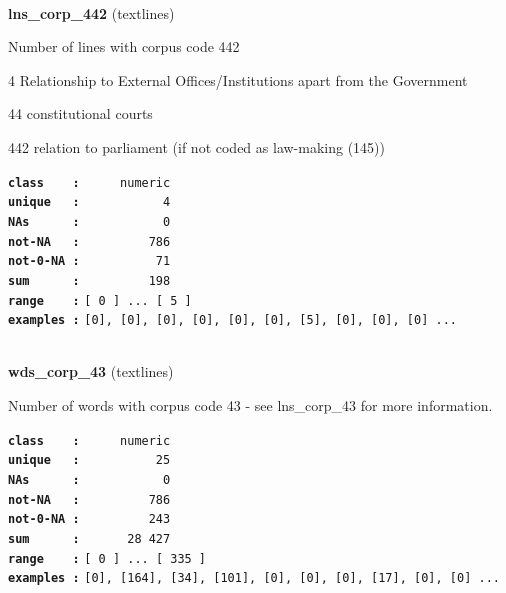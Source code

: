 \documentclass[]{article}
\begin{document}
~

\textbf{lns\_corp\_442} (textlines)

Number of lines with corpus code 442

4 Relationship to External Offices/Institutions apart from the
Government

44 constitutional courts

442 relation to parliament (if not coded as law-making (145))

\textbf{\texttt{class\ \ \ \ :}} \texttt{~~~~~numeric}\\
\textbf{\texttt{unique\ \ \ :}} \texttt{~~~~~~~~~~~4}\\
\textbf{\texttt{NAs\ \ \ \ \ \ :}} \texttt{~~~~~~~~~~~0}\\
\textbf{\texttt{not-NA\ \ \ :}} \texttt{~~~~~~~~~786}\\
\textbf{\texttt{not-0-NA\ :}} \texttt{~~~~~~~~~~71}\\
\textbf{\texttt{sum\ \ \ \ \ \ :}} \texttt{~~~~~~~~~198}\\
\textbf{\texttt{range\ \ \ \ :}}
\texttt{{[}\ 0\ {]}\ ...\ {[}\ 5\ {]}}\\
\textbf{\texttt{examples\ :}}
\texttt{{[}0{]},\ {[}0{]},\ {[}0{]},\ {[}0{]},\ {[}0{]},\ {[}0{]},\ {[}5{]},\ {[}0{]},\ {[}0{]},\ {[}0{]}\ ...}\\

~

\textbf{wds\_corp\_43} (textlines)

Number of words with corpus code 43 - see lns\_corp\_43 for more
information.

\textbf{\texttt{class\ \ \ \ :}} \texttt{~~~~~numeric}\\
\textbf{\texttt{unique\ \ \ :}} \texttt{~~~~~~~~~~25}\\
\textbf{\texttt{NAs\ \ \ \ \ \ :}} \texttt{~~~~~~~~~~~0}\\
\textbf{\texttt{not-NA\ \ \ :}} \texttt{~~~~~~~~~786}\\
\textbf{\texttt{not-0-NA\ :}} \texttt{~~~~~~~~~243}\\
\textbf{\texttt{sum\ \ \ \ \ \ :}} \texttt{~~~~~~28~427}\\
\textbf{\texttt{range\ \ \ \ :}}
\texttt{{[}\ 0\ {]}\ ...\ {[}\ 335\ {]}}\\
\textbf{\texttt{examples\ :}}
\texttt{{[}0{]},\ {[}164{]},\ {[}34{]},\ {[}101{]},\ {[}0{]},\ {[}0{]},\ {[}0{]},\ {[}17{]},\ {[}0{]},\ {[}0{]}\ ...}\\

~
\end{document}
